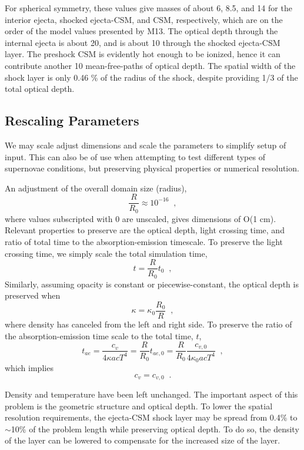 \documentclass[]{article}
\begin{document}
		For spherical symmetry, these values give masses of about 6, 8.5, and 14 for the interior ejecta, shocked ejecta-CSM, and CSM, respectively, which are on the order of the model values presented by M13. The optical depth through the internal ejecta is about 20, and is about 10 through the shocked ejecta-CSM layer. The preshock CSM is evidently hot enough to be ionized, hence it can contribute another 10 mean-free-paths of optical depth. The spatial width of the shock layer is only 0.46 \% of the radius of the shock, despite providing 1/3 of the total optical depth.
		
	\subsection{Rescaling Parameters} \label{sec:rescaling}
		We may scale adjust dimensions and scale the parameters to simplify setup of input. This can also be of use when attempting to test different types of supernovae conditions, but preserving physical properties or numerical resolution.
		
		An adjustment of the overall domain size (radius),
		\begin{equation}
			\frac{R}{R_0} \approx 10^{-16} \;\;,
		\end{equation}
		where values subscripted with $0$ are unscaled, gives dimensions of O(1 cm). Relevant properties to preserve are the optical depth, light crossing time, and ratio of total time to the absorption-emission timescale. To preserve the light crossing time, we simply scale the total simulation time,
		\begin{equation}
			t = \frac{R}{R_0}t_0 \;\;,
		\end{equation}
		Similarly, assuming opacity is constant or piecewise-constant, the optical depth is preserved when
		\begin{equation}
			\kappa = \kappa_0\frac{R_0}{R} \;\;,
		\end{equation}
		where density has canceled from the left and right side. To preserve the ratio of the absorption-emission time scale to the total time, $t$,
		\begin{equation}
			t_{ae} = \frac{c_v}{4\kappa acT^4} = \frac{R}{R_0}t_{ae,0}
			= \frac{R}{R_0}\frac{c_{v,0}}{4\kappa_0 acT^4} \;\;,
		\end{equation}
		which implies
		\begin{equation}
			c_v = c_{v,0} \;\;.
		\end{equation}
		
		Density and temperature have been left unchanged. The important aspect of this problem is the geometric structure and optical depth. To lower the spatial resolution requirements, the ejecta-CSM shock layer may be spread from 0.4\% to $\sim$10\% of the problem length while preserving optical depth. To do so, the density of the layer can be lowered to compensate for the increased size of the layer.
		
\end{document}
